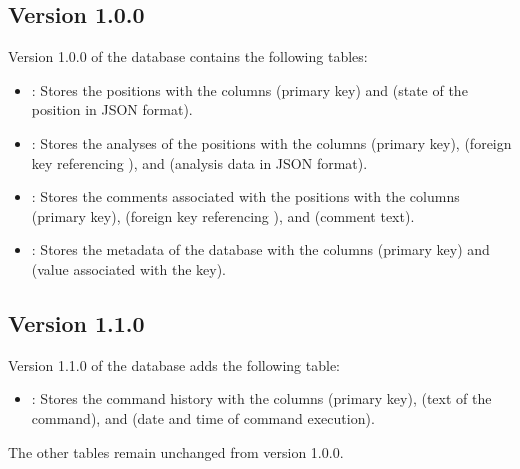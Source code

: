 \documentclass[letterpaper,10pt,english]{sphinxmanual}
\begin{document}
\subsection{Version 1.0.0}
\label{\detokenize{annexe_db_scheme:version-1-0-0}}
\sphinxAtStartPar
Version 1.0.0 of the database contains the following tables:
\begin{itemize}
\item {} 
\sphinxAtStartPar
{}: Stores the positions with the columns  (primary key) and  (state of the position in JSON format).

\item {} 
\sphinxAtStartPar
{}: Stores the analyses of the positions with the columns  (primary key),  (foreign key referencing ), and  (analysis data in JSON format).

\item {} 
\sphinxAtStartPar
{}: Stores the comments associated with the positions with the columns  (primary key),  (foreign key referencing ), and  (comment text).

\item {} 
\sphinxAtStartPar
{}: Stores the metadata of the database with the columns  (primary key) and  (value associated with the key).

\end{itemize}


\subsection{Version 1.1.0}
\label{\detokenize{annexe_db_scheme:version-1-1-0}}
\sphinxAtStartPar
Version 1.1.0 of the database adds the following table:
\begin{itemize}
\item {} 
\sphinxAtStartPar
{}: Stores the command history with the columns  (primary key),  (text of the command), and  (date and time of command execution).

\end{itemize}

\sphinxAtStartPar
The other tables remain unchanged from version 1.0.0.
\end{document}

